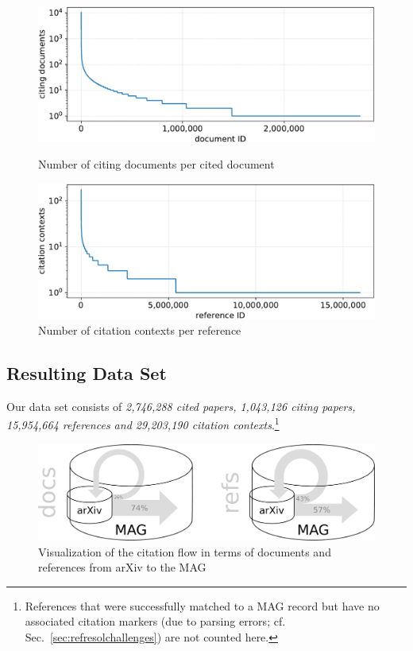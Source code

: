 \begin{figure}[!ht]
  \centering
  \includegraphics[width=0.92\linewidth]{figures/corpus/Fig2.pdf}
  \caption{Number of citing documents per cited document}
  \label{fig:numcitdoc}
  \vspace{1em}
  \includegraphics[width=0.92\linewidth]{figures/corpus/Fig3.pdf}
  \caption{Number of citation contexts per reference}
  \label{fig:numcontref}
    \vspace{1em}
\end{figure}

\subsection{Resulting Data Set}
Our data set consists of \emph{2,746,288 cited papers, 1,043,126 citing papers, 15,954,664 references and 29,203,190 citation contexts}.\footnote{References that were successfully matched to a MAG record but have no associated citation markers (due to parsing errors; cf. Sec.~\ref{sec:refresolchallenges}) are not counted here.} 

\begin{figure}[tb]
  \centering
    \includegraphics[width=.9\textwidth]{figures/corpus/Fig4.pdf}
  \caption{Visualization of the citation flow in terms of documents and references from arXiv to the MAG}
  \label{fig:inflow}
\end{figure}

